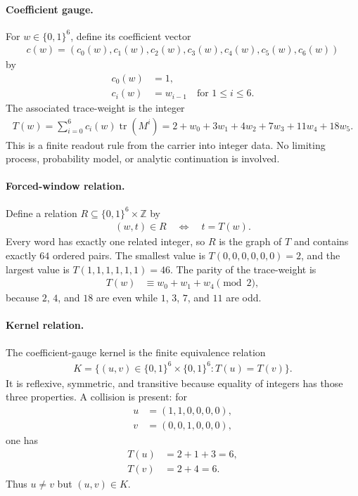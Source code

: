 \paragraph{Coefficient gauge.}
For $w\in\{0,1\}^6$, define its coefficient vector
$$
\begin{aligned}
c(w)=(c_0(w),c_1(w),c_2(w),c_3(w),c_4(w),c_5(w),c_6(w))
\end{aligned}
$$
by
$$
\begin{aligned}
c_0(w)&=1,\\
c_i(w)&=w_{i-1}\quad \text{for }1\leq i\leq 6.
\end{aligned}
$$
The associated trace-weight is the integer
$$
\begin{aligned}
T(w)=\sum_{i=0}^{6}c_i(w)\operatorname{tr}(M^i)
=2+w_0+3w_1+4w_2+7w_3+11w_4+18w_5.
\end{aligned}
$$
This is a finite readout rule from the carrier into integer data.  No limiting process, probability model, or analytic continuation is involved.

\paragraph{Forced-window relation.}
Define a relation $R\subseteq\{0,1\}^6\times\mathbb{Z}$ by
$$
\begin{aligned}
(w,t)\in R \quad \Longleftrightarrow \quad t=T(w).
\end{aligned}
$$
Every word has exactly one related integer, so $R$ is the graph of $T$ and contains exactly $64$ ordered pairs.  The smallest value is $T(0,0,0,0,0,0)=2$, and the largest value is $T(1,1,1,1,1,1)=46$.  The parity of the trace-weight is
$$
\begin{aligned}
T(w)&\equiv w_0+w_1+w_4 \pmod 2,
\end{aligned}
$$
because $2$, $4$, and $18$ are even while $1$, $3$, $7$, and $11$ are odd.

\paragraph{Kernel relation.}
The coefficient-gauge kernel is the finite equivalence relation
$$
\begin{aligned}
K=\{(u,v)\in\{0,1\}^6\times\{0,1\}^6:T(u)=T(v)\}.
\end{aligned}
$$
It is reflexive, symmetric, and transitive because equality of integers has those three properties.  A collision is present: for
$$
\begin{aligned}
u&=(1,1,0,0,0,0),\\
v&=(0,0,1,0,0,0),
\end{aligned}
$$
one has
$$
\begin{aligned}
T(u)&=2+1+3=6,\\
T(v)&=2+4=6.
\end{aligned}
$$
Thus $u\neq v$ but $(u,v)\in K$.

